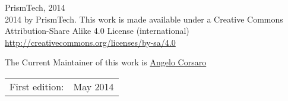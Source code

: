
\pagestyle{empty}
\begingroup
\footnotesize
\parindent 0pt
\parskip \baselineskip
\ccbysa{}  PrismTech, 2014 \\
\newline
\textcopyright{} 2014 by PrismTech.  This work is made available under a Creative Commons Attribution-Share Alike 4.0 License (international) \\
\href{http://creativecommons.org/licenses/by-sa/4.0}{http://creativecommons.org/licenses/by-sa/4.0}

    The Current Maintainer of this work is \href{mailto:angelo@icorsaro.net}{Angelo Corsaro}


\begin{center}
\begin{tabular}{ll}
First edition:  & May 2014 \\
\end{tabular}
\end{center}
%
%
%
%
%

\vspace*{2\baselineskip}


\endgroup
\clearpage
